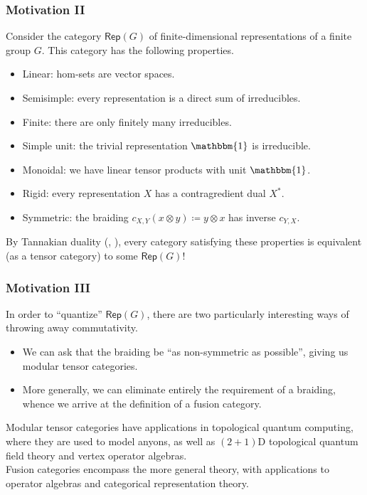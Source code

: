 \documentclass{beamer}
\newcommand{\textcat}[1]{\mathrm{\textsf{#1}}}
\begin{document}
\begin{frame}
\frametitle{Motivation II}
Consider the category $\textcat{Rep}(G)$ of finite-dimensional representations of a finite group $G$. This category has the following properties.\\[1.5ex]
\begin{itemize}
\item \textcolor{structure}{Linear}: hom-sets are vector spaces.
\item \textcolor{structure}{Semisimple}: every representation is a direct sum of irreducibles.
\item \textcolor{structure}{Finite}: there are only finitely many irreducibles.
\item \textcolor{structure}{Simple unit}: the trivial representation $\mathbbm{1}$ is irreducible.
\item \textcolor{structure}{Monoidal}: we have linear tensor products with unit $\mathbbm{1}$.
\item \textcolor{structure}{Rigid}: every representation $X$ has a contragredient dual $X^*$.
\item \textcolor{structure}{Symmetric}: the braiding $c_{X,Y}(x \otimes y) \coloneqq y \otimes x$ has inverse $c_{Y,X}$.\\[2ex]
\end{itemize}
By Tannakian duality (\cite{Del90}, \cite{Del02}), every category satisfying these properties is equivalent (as a tensor category) to some $\textcat{Rep}(G)$!
\end{frame}

\begin{frame}
\frametitle{Motivation III}
In order to ``quantize'' $\textcat{Rep}(G)$, there are two particularly interesting ways of throwing away commutativity.\\[1.5ex]
\begin{itemize}
\item We can ask that the braiding be ``as non-symmetric as possible'', giving us \textcolor{structure}{modular tensor categories}.\\[2ex]
\item More generally, we can eliminate entirely the requirement of a braiding, whence we arrive at the definition of a \textcolor{structure}{fusion category}.\\[2ex]
\end{itemize}
Modular tensor categories have applications in topological quantum computing, where they are used to model anyons, as well as $(2+1)$D topological quantum field theory and vertex operator algebras.\\[2ex]

Fusion categories encompass the more general theory, with applications to operator algebras and categorical representation theory.
\end{frame}
\end{document}
